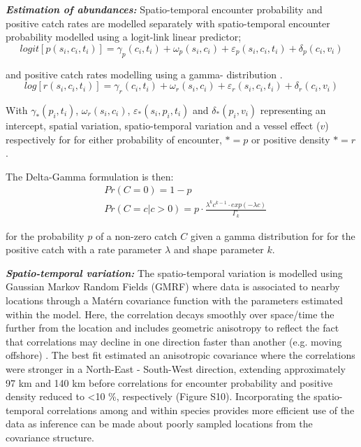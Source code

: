 \documentclass{nature}
\begin{document}
\begin{linenumbers}
\textbf{\textit{Estimation of abundances:}} Spatio-temporal encounter
probability and positive catch rates are modelled separately with
spatio-temporal encounter probability modelled using a logit-link linear
predictor;
		\begin{equation}
			logit[p(s_{i},c_{i},t_{i})] = \gamma_{p}(c_{i},t_{i}) +
			\omega_{p}(s_{i},c_{i}) + \varepsilon_{p}(s_{i},c_{i},t_{i}) + 
			\delta_{p}(c_{i}, v_{i})
		\end{equation}

and positive catch rates modelling using a gamma- distribution \cite{Thorson2015a}. 
		\begin{equation}
			log[r(s_{i},c_{i},t_{i})] = \gamma_{r}(c_{i},t_{i}) +
			\omega_{r}(s_{i},c_{i}) + \varepsilon_{r}(s_{i},c_{i},t_{i}) + 
			\delta_{r}(c_{i},v_{i})
		\end{equation}

With $\gamma_{*}(p_{i},t_{i})$, $\omega_{r}(s_{i},c_{i})$,
$\varepsilon_{*}(s_{i},p_{i},t_{i})$ and $\delta_{*}(p_{i}, v_{i})$
representing an intercept, spatial variation, spatio-temporal variation and a
vessel effect ($v$) respectively for for either probability of encounter, $* =
p$ or positive density $* = r$.

The Delta-Gamma formulation is then:
\begin{equation}
	\begin{split}
	& Pr(C = 0) = 1 - p \\
	& Pr(C = c | c > 0) = p \cdot \frac{\lambda^{k}c^{k-1} \cdot exp(-\lambda c)}{\Gamma_{k}}
	\end{split}
\end{equation}

for the probability $p$ of a non-zero catch $C$ given a gamma distribution for
for the positive catch with a rate parameter $\lambda$ and shape parameter $k$.

\textbf{\textit{Spatio-temporal variation:}} The spatio-temporal variation is
modelled using Gaussian Markov Random Fields (GMRF) where data is associated to
nearby locations through a Matérn covariance function with the parameters
estimated within the model. Here, the correlation decays smoothly over
space/time the further from the location and includes geometric anisotropy to
reflect the fact that correlations may decline in one direction faster than
another (e.g. moving offshore) \cite{Thorson2013}.  The best fit estimated an
anisotropic covariance where the correlations were stronger in a North-East -
South-West direction, extending approximately 97 km and 140 km before
correlations for encounter probability and positive density reduced to
\textless 10 \%, respectively (Figure S10).  Incorporating the spatio-temporal
correlations among and within species provides more efficient use of the data
as inference can be made about poorly sampled locations from the covariance
structure.


\end{linenumbers}
\end{document}
